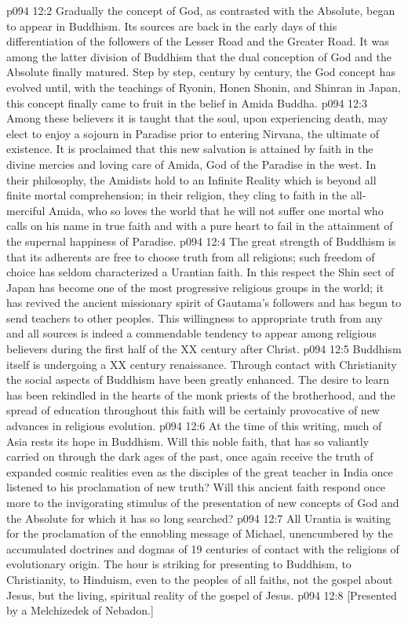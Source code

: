 \vs p094 12:2 \pc Gradually the concept of God, as contrasted with the Absolute, began to appear in Buddhism. Its sources are back in the early days of this differentiation of the followers of the Lesser Road and the Greater Road. It was among the latter division of Buddhism that the dual conception of God and the Absolute finally matured. Step by step, century by century, the God concept has evolved until, with the teachings of Ryonin, Honen Shonin, and Shinran in Japan, this concept finally came to fruit in the belief in Amida Buddha.
\vs p094 12:3 Among these believers it is taught that the soul, upon experiencing death, may elect to enjoy a sojourn in Paradise prior to entering Nirvana, the ultimate of existence. It is proclaimed that this new salvation is attained by faith in the divine mercies and loving care of Amida, God of the Paradise in the west. In their philosophy, the Amidists hold to an Infinite Reality which is beyond all finite mortal comprehension; in their religion, they cling to faith in the all\hyp{}merciful Amida, who so loves the world that he will not suffer one mortal who calls on his name in true faith and with a pure heart to fail in the attainment of the supernal happiness of Paradise.
\vs p094 12:4 The great strength of Buddhism is that its adherents are free to choose truth from all religions; such freedom of choice has seldom characterized a Urantian faith. In this respect the Shin sect of Japan has become one of the most progressive religious groups in the world; it has revived the ancient missionary spirit of Gautama’s followers and has begun to send teachers to other peoples. This willingness to appropriate truth from any and all sources is indeed a commendable tendency to appear among religious believers during the first half of the XX century after Christ.
\vs p094 12:5 Buddhism itself is undergoing a XX century renaissance. Through contact with Christianity the social aspects of Buddhism have been greatly enhanced. The desire to learn has been rekindled in the hearts of the monk priests of the brotherhood, and the spread of education throughout this faith will be certainly provocative of new advances in religious evolution.
\vs p094 12:6 At the time of this writing, much of Asia rests its hope in Buddhism. Will this noble faith, that has so valiantly carried on through the dark ages of the past, once again receive the truth of expanded cosmic realities even as the disciples of the great teacher in India once listened to his proclamation of new truth? Will this ancient faith respond once more to the invigorating stimulus of the presentation of new concepts of God and the Absolute for which it has so long searched?
\vs p094 12:7 \pc All Urantia is waiting for the proclamation of the ennobling message of Michael, unencumbered by the accumulated doctrines and dogmas of 19 centuries of contact with the religions of evolutionary origin. The hour is striking for presenting to Buddhism, to Christianity, to Hinduism, even to the peoples of all faiths, not the gospel about Jesus, but the living, spiritual reality of the gospel of Jesus.
\vsetoff
\vs p094 12:8 [Presented by a Melchizedek of Nebadon.]
\quizlink
